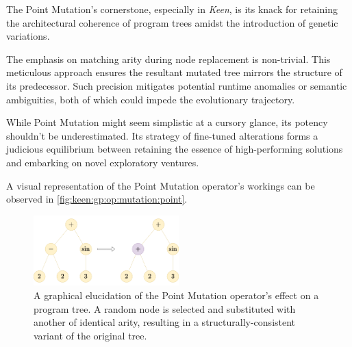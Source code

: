   The Point Mutation's cornerstone, especially in \textit{Keen}, is its knack 
  for retaining the architectural coherence of program trees amidst the 
  introduction of genetic variations.

  \begin{remark}
    The emphasis on matching arity during node replacement is non-trivial. This 
    meticulous approach ensures the resultant mutated tree mirrors the 
    structure of its predecessor. Such precision mitigates potential runtime 
    anomalies or semantic ambiguities, both of which could impede the 
    evolutionary trajectory.
  \end{remark}

  While Point Mutation might seem simplistic at a cursory glance, its potency 
  shouldn't be underestimated. Its strategy of fine-tuned alterations forms a 
  judicious equilibrium between retaining the essence of high-performing 
  solutions and embarking on novel exploratory ventures.

  A visual representation of the Point Mutation operator's workings can be 
  observed in \vref{fig:keen:gp:op:mutation:point}.

  \begin{figure}[ht!]
    \centering
    \includegraphics[width=0.5\textwidth]{img/keen/Point mutation.png}
    \caption{
      A graphical elucidation of the Point Mutation operator's effect on a 
      program tree. A random node is selected and substituted with another of 
      identical arity, resulting in a structurally-consistent variant of the 
      original tree.
    }
    \label{fig:keen:gp:op:mutation:point}
  \end{figure}
